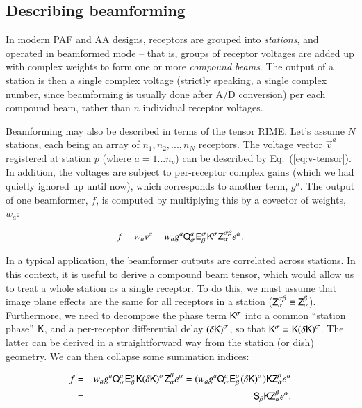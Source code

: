 \documentclass{aa}
\begin{document}
\subsection{Describing beamforming}

In modern PAF and AA designs, receptors are grouped into \emph{stations}, and operated in beamformed mode -- that is, groups of receptor 
voltages are added up with complex weights to form one or more \emph{compound beams}. The output of a station is then a single complex voltage 
(strictly speaking, a single complex number, since beamforming is usually done after A/D conversion) per each compound beam, rather than $n$ individual 
receptor voltages.

Beamforming may also be described in terms of the tensor RIME. Let's assume $N$ stations, each being an array of $n_{1},n_{2},...,n_{N}$
receptors. The voltage vector $\vec v^a$ registered at station $p$ (where $a=1...n_p$) can be described by Eq.~(\ref{eq:v-tensor}). In addition, the voltages are subject to per-receptor complex gains (which we had quietly ignored up until now), which corresponds to another term, $g^a$.
The output of one beamformer, $f$, is computed by multiplying this by a covector of weights, $w_{a}$:

\begin{equation}
\label{eq:beamformer-output}  
f=w_{a}v^{a}=w_a g^a \mathsf{Q}_{\sigma}^{a}\mathsf{E}_{\beta}^{\sigma}\mathsf{K}^{\sigma}\mathsf{Z}_{\alpha}^{\sigma\beta}e^{\alpha}.
\end{equation}

In a typical application, the beamformer outputs are correlated across stations. In this context, it is useful to derive a compound beam tensor,
which would allow us to treat a whole station as a single receptor. To do this, we must assume that image plane effects are the same for
all receptors in a station ($\mathsf{Z}_{\alpha}^{\sigma\beta}\equiv \mathsf{Z}_{\alpha}^{\beta}$). Furthermore, we need to decompose the 
phase term $\mathsf{K}^{\sigma}$ into a common ``station phase'' $\mathsf{K}$, and a per-receptor differential delay $(\mathsf{\delta{K)}}^{\sigma}$, so that $\mathsf{K}^{\sigma}=\mathsf{K}{(\mathsf{\delta K})}^{\sigma}$. The latter can be derived in a straightforward way from the station (or dish) geometry. We can then collapse some summation indices:

\begin{eqnarray}
\nonumber f & = &w_{a}g^a\mathsf{Q}_{\sigma}^{a}\mathsf{E}_{\beta}^{\sigma}\mathsf{K}{\mathsf{(\delta K)}}^{\sigma}\mathsf{Z}_{\alpha}^{\beta}e^{\alpha}=
(w_{a}g^a\mathsf{Q}_{\sigma}^{a}\mathsf{E}_{\beta}^{\sigma}{\mathsf{(\delta K)}}^{\sigma})\mathsf{K}\mathsf{Z}_{\alpha}^{\beta}e^{\alpha} \\
& = & \mathsf{S}_{\beta}\mathsf{K}\mathsf{Z}_{\alpha}^{\beta}e^{\alpha}.
\label{eq:compound-beam}
\end{eqnarray}
\end{document}
